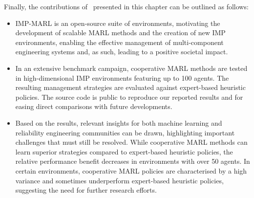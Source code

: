 Finally, the contributions of~\citep{leroy2023impmarl} presented in this chapter can be outlined as follows:
\begin{itemize}
  \item IMP-MARL is an open-source suite of environments, motivating the development of scalable MARL methods and the creation of new IMP environments, enabling the effective management of multi-component engineering systems and, as such, leading to a positive societal impact.
  \item In an extensive benchmark campaign, cooperative MARL methods are tested in high-dimensional IMP environments featuring up to 100 agents.
  The resulting management strategies are evaluated against expert-based heuristic policies.
  The source code is public to reproduce our reported results and for easing direct comparisons with future developments.
  \item Based on the results, relevant insights for both machine learning and reliability engineering communities can be drawn, highlighting important challenges that must still be resolved.
  While cooperative MARL methods can learn superior strategies compared to expert-based heuristic policies, the relative performance benefit decreases in environments with over 50 agents.
  In certain environments, cooperative MARL policies are characterised by a high variance and sometimes underperform expert-based heuristic policies, suggesting the need for further research efforts.
\end{itemize}

